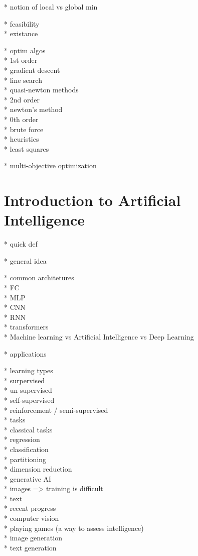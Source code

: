 * notion of local vs global min

* feasibility\\
* existance

* optim algos\\
  * 1st order\\
    * gradient descent\\
    * line search\\
    * quasi-newton methods\\
  * 2nd order\\
    * newton's method\\
  * 0th order\\
    * brute force\\
    * heuristics\\

* least squares

* multi-objective optimization

\section{Introduction to Artificial Intelligence}

* quick def

* general idea

* common architetures\\
  * FC\\
  * MLP\\
  * CNN\\
  * RNN\\
  * transformers\\

* Machine learning vs Artificial Intelligence vs Deep Learning

* applications

* learning types\\
  * surpervised\\
  * un-supervised\\
  * self-supervised\\
  * reinforcement / semi-supervised\\

* tasks\\
  * classical tasks\\
    * regression\\
    * classification\\
    * partitioning\\
    * dimension reduction\\
  * generative AI\\
    * images => training is difficult\\
    * text\\

* recent progress\\
  * computer vision\\
  * playing games (a way to assess intelligence)\\
  * image generation\\
  * text generation\\




